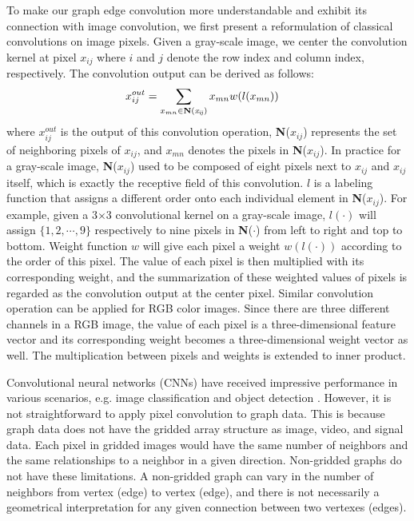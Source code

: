 \documentclass[a4paper,11pt]{article}
\begin{document}
To make our graph edge convolution more understandable and exhibit its connection with image convolution, we first present a reformulation of classical convolutions on image pixels. Given a gray-scale image, we center the convolution kernel at pixel $x_{ij}$ where $i$ and $j$ denote the row index and column index, respectively. The convolution output can be derived as follows:
\begin{align}
  &x_{ij}^{out} = \sum_{x_{mn} \in {\bf N({\it x_{ij}})} } x_{mn}w(l(x_{mn}))&
\end{align}
where $x_{ij}^{out}$ is the output of this convolution operation, {\bf N}($x_{ij}$) represents the set of neighboring pixels of $x_{ij}$, and $x_{mn}$ denotes the pixels in {\bf N}($x_{ij}$). In practice for a gray-scale image, {\bf N}($x_{ij}$) used to be composed of eight pixels next to $x_{ij}$ and $x_{ij}$ itself, which is exactly the receptive field of this convolution. $l$ is a labeling function that assigns a different order onto each individual element in {\bf N}($x_{ij}$). For example, given a 3$\times$3 convolutional kernel on a gray-scale image, $l(\cdot)$ will assign $\{1, 2, \cdots, 9\}$ respectively to nine pixels in {\bf N}($\cdot$) from left to right and top to bottom.  Weight function $w$ will give each pixel a weight $w(l(\cdot))$ according to the order of this pixel. The value of each pixel is then multiplied with its corresponding weight, and the summarization of these weighted values of pixels is regarded as the convolution output at the center pixel. Similar convolution operation can be applied for RGB color images. Since there are three different channels in a RGB image, the value of each pixel is a three-dimensional feature vector and its corresponding weight becomes a three-dimensional weight vector as well. The multiplication between pixels and weights is extended to inner product.


Convolutional neural networks (CNNs) have received impressive performance in various scenarios, e.g. image classification and object detection \cite{ge2016robust,krizhevsky2012imagenet,redmon2016you,ren2015faster,simonyan2014very,zhang20173,xiong2017learning}. However, it is not straightforward to apply pixel convolution to graph data. This is because graph data does not have the gridded array structure as image, video, and signal data. Each pixel in gridded images would have the same number of neighbors and the same relationships to a neighbor in a given direction. Non-gridded graphs do not have these limitations. A non-gridded graph can vary in the number of neighbors from vertex (edge) to vertex (edge), and there is not necessarily a geometrical interpretation for any given connection between two vertexes (edges).
\end{document}
